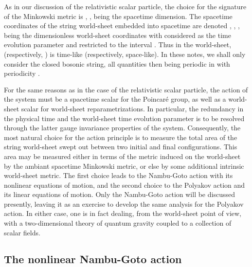 \documentclass[a4paper,11pt]{article}
\begin{document}
As in our discussion of the relativistic scalar particle, the choice
for the signature of the Minkowski metric is 
\coordHE{}, \coordHE{},
\coordHE{} being the spacetime dimension. The spacetime coordinates of the
string world-sheet embedded into spacetime are denoted 
\coordHE{}, \myHighlight{$\xi^\alpha=(\tau,\sigma)$}\coordHE{}, \coordHE{},
being the dimensionless world-sheet coordinates with \myHighlight{$\tau$}\coordHE{} considered
as the time evolution parameter and \myHighlight{$\sigma$}\coordHE{} restricted to the interval
\myHighlight{$0\le\sigma\le\pi$}\coordHE{}. Thus in the world-sheet, \myHighlight{$\tau$}\coordHE{} (respectively, \myHighlight{$\sigma$}\coordHE{}) 
is time-like (respectively, space-like). In these notes, we shall only
consider the closed bosonic string, all quantities then being periodic
in \myHighlight{$\sigma$}\coordHE{} with periodicity \myHighlight{$\pi$}\coordHE{}.

For the same reasons as in the case of the relativistic scalar particle,
the action of the system must be a spacetime scalar for the Poincar\'e
group, as well as a world-sheet scalar for world-sheet reparametrizations.
In particular, the redundancy in the physical time \coordHE{} and the world-sheet
time evolution parameter \myHighlight{$\tau$}\coordHE{} is to be resolved through the latter gauge 
invariance properties
of the system. Consequently, the most natural choice for the action
principle is to measure the total area of the string world-sheet swept out
between two initial and final configurations. This area may be measured either
in terms of the metric induced on the world-sheet by the ambiant spacetime
Minkowski metric, or else by some additional intrinsic world-sheet metric.
The first choice leads to the Nambu-Goto action with its nonlinear equations
of motion, and the second choice to the Polyakov action and its linear
equations of motion. Only the Nambu-Goto action will be discussed
presently, leaving it as an exer\-ci\-se to develop the same analysis
for the Polyakov action. In either case, one is in fact dealing, from the 
world-sheet point of view, with a two-dimensional theory of quantum 
gravity coupled to a collection of scalar fields.

\subsection{The nonlinear Nambu-Goto action}
\label{Subsect7.1}
\end{document}
